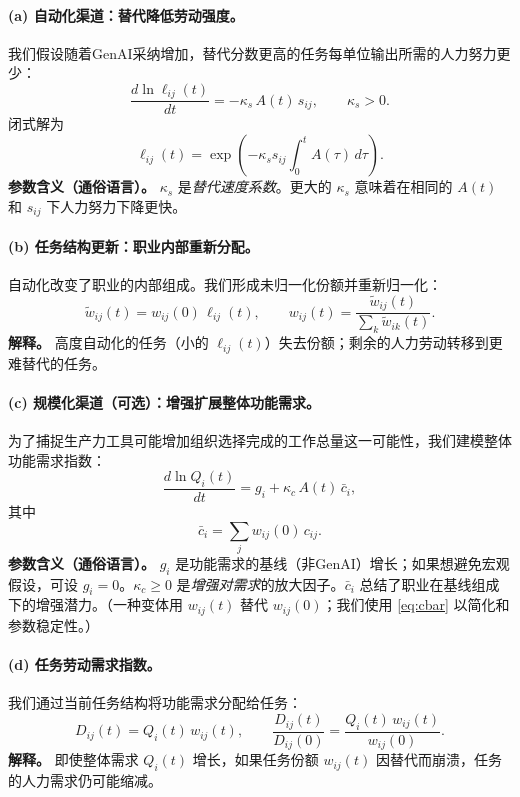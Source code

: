 \paragraph{(a) 自动化渠道：替代降低劳动强度。}
我们假设随着GenAI采纳增加，替代分数更高的任务每单位输出所需的人力努力更少：
\begin{equation}
\label{eq:labor_intensity_ode}
\frac{d \ln \ell_{ij}(t)}{dt} = -\kappa_s\,A(t)\,s_{ij}, \qquad \kappa_s>0.
\end{equation}
闭式解为
\begin{equation}
\label{eq:labor_intensity_closed}
\ell_{ij}(t) = \exp\!\left(-\kappa_s s_{ij}\int_0^t A(\tau)\,d\tau\right).
\end{equation}
\noindent\textbf{参数含义（通俗语言）。} $\kappa_s$ 是\emph{替代速度系数}。更大的 $\kappa_s$ 意味着在相同的 $A(t)$ 和 $s_{ij}$ 下人力努力下降更快。

\paragraph{(b) 任务结构更新：职业内部重新分配。}
自动化改变了职业的内部组成。我们形成未归一化份额并重新归一化：
\begin{equation}
\label{eq:share_update}
\tilde w_{ij}(t) = w_{ij}(0)\,\ell_{ij}(t), 
\qquad
w_{ij}(t)=\frac{\tilde w_{ij}(t)}{\sum_{k} \tilde w_{ik}(t)}.
\end{equation}
\noindent\textbf{解释。} 高度自动化的任务（小的 $\ell_{ij}(t)$）失去份额；剩余的人力劳动转移到更难替代的任务。

\paragraph{(c) 规模化渠道（可选）：增强扩展整体功能需求。}
为了捕捉生产力工具可能增加组织选择完成的工作总量这一可能性，我们建模整体功能需求指数：
\begin{equation}
\label{eq:Q_ode}
\frac{d \ln Q_i(t)}{dt} = g_i + \kappa_c\,A(t)\,\bar c_i,
\end{equation}
其中
\begin{equation}
\label{eq:cbar}
\bar c_i = \sum_{j} w_{ij}(0)\,c_{ij}.
\end{equation}
\noindent\textbf{参数含义（通俗语言）。} $g_i$ 是功能需求的基线（非GenAI）增长；如果想避免宏观假设，可设 $g_i=0$。$\kappa_c\ge 0$ 是\emph{增强对需求}的放大因子。$\bar c_i$ 总结了职业在基线组成下的增强潜力。（一种变体用 $w_{ij}(t)$ 替代 $w_{ij}(0)$；我们使用 \eqref{eq:cbar} 以简化和参数稳定性。）

\paragraph{(d) 任务劳动需求指数。}
我们通过当前任务结构将功能需求分配给任务：
\begin{equation}
\label{eq:D_def}
D_{ij}(t) = Q_i(t)\,w_{ij}(t),
\qquad
\frac{D_{ij}(t)}{D_{ij}(0)}=\frac{Q_i(t)\,w_{ij}(t)}{w_{ij}(0)}.
\end{equation}
\noindent\textbf{解释。} 即使整体需求 $Q_i(t)$ 增长，如果任务份额 $w_{ij}(t)$ 因替代而崩溃，任务的人力需求仍可能缩减。

